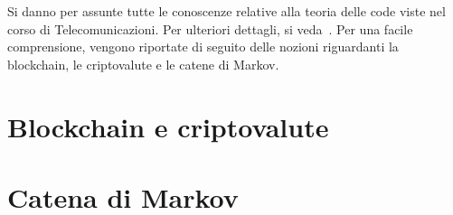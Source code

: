 Si danno per assunte tutte le conoscenze relative alla teoria delle code viste nel corso di Telecomunicazioni. Per ulteriori dettagli, si veda~\cite[cap. 8]{libro:tele}.
Per una facile comprensione, vengono riportate di seguito delle nozioni riguardanti la blockchain, le criptovalute e le catene di Markov.

\section{Blockchain e criptovalute}
\label{sottocap:bc-cripto}


\section{Catena di Markov}
\label{sottocap:teo-code}

